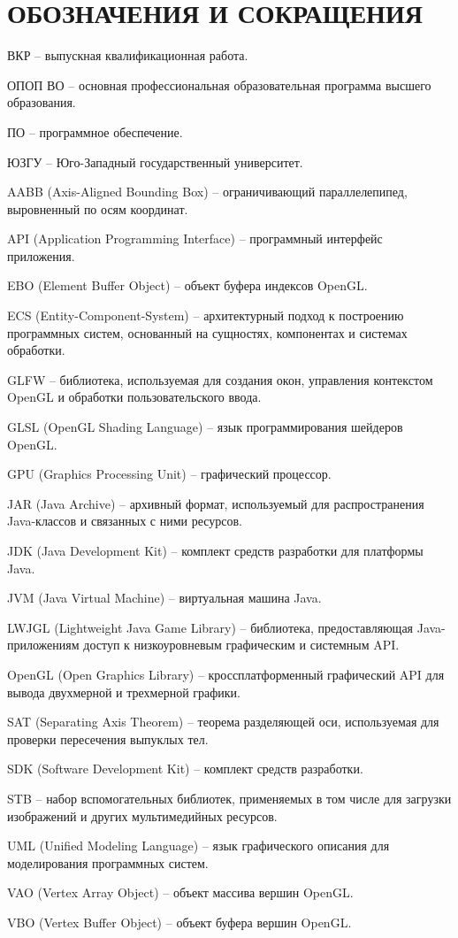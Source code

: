 \section*{ОБОЗНАЧЕНИЯ И СОКРАЩЕНИЯ}

ВКР -- выпускная квалификационная работа.

ОПОП ВО -- основная профессиональная образовательная программа высшего образования.

ПО -- программное обеспечение.

ЮЗГУ -- Юго-Западный государственный университет.

AABB (Axis-Aligned Bounding Box) -- ограничивающий параллелепипед, выровненный по осям координат.

API (Application Programming Interface) -- программный интерфейс приложения.

EBO (Element Buffer Object) -- объект буфера индексов OpenGL.

ECS (Entity-Component-System) -- архитектурный подход к построению программных систем, основанный на сущностях, компонентах и системах обработки.

GLFW -- библиотека, используемая для создания окон, управления контекстом OpenGL и обработки пользовательского ввода.

GLSL (OpenGL Shading Language) -- язык программирования шейдеров OpenGL.

GPU (Graphics Processing Unit) -- графический процессор.

JAR (Java Archive) -- архивный формат, используемый для распространения Java-классов и связанных с ними ресурсов.

JDK (Java Development Kit) -- комплект средств разработки для платформы Java.

JVM (Java Virtual Machine) -- виртуальная машина Java.

LWJGL (Lightweight Java Game Library) -- библиотека, предоставляющая Java-приложениям доступ к низкоуровневым графическим и системным API.

OpenGL (Open Graphics Library) -- кроссплатформенный графический API для вывода двухмерной и трехмерной графики.

SAT (Separating Axis Theorem) -- теорема разделяющей оси, используемая для проверки пересечения выпуклых тел.

SDK (Software Development Kit) -- комплект средств разработки.

STB -- набор вспомогательных библиотек, применяемых в том числе для загрузки изображений и других мультимедийных ресурсов.

UML (Unified Modeling Language) -- язык графического описания для моделирования программных систем.

VAO (Vertex Array Object) -- объект массива вершин OpenGL.

VBO (Vertex Buffer Object) -- объект буфера вершин OpenGL.
